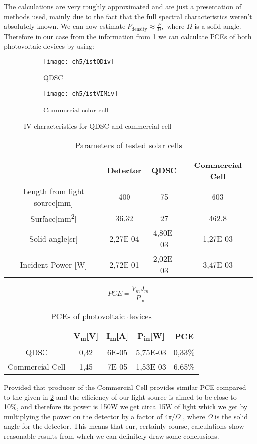 \noindent The calculations are very roughly approximated and are just a
presentation of methods used, mainly due to the fact that the full
spectral characteristics weren't absolutely known. We can now estimate
\(P_{\text{density}} \approx \frac{P}{\Omega},\) where \(\Omega\) is a
solid angle. Therefore in our case from the information from \ref{tab:1stparam} we can calculate PCEs of both
photovoltaic devices by using:
\begin{figure}[b]
	\centering
	\begin{subfigure}[b]{0.49\textwidth}
	\centering
	\texttt{[image: ch5/istQDiv]}
	\caption{QDSC}
	\end{subfigure}
	\hfill
	\begin{subfigure}[b]{0.49\textwidth}
	\centering
	\texttt{[image: ch5/istVIMiv]}
	\caption{Commercial solar cell}{}
	\end{subfigure}
	\caption{IV characteristics for QDSC and commercial cell }
\end{figure}

\begin{table}[h]
\centering
\begin{tabular}{|c |c | c | c |}
\hline
& Detector & QDSC & Commercial Cell\\
\hline
Length from light source{[}mm{]} & 400 & 75 & 603\\
\hline
Surface{[}mm\textsuperscript{2}{]} & 36,32 & 27 & 462,8\\
\hline
Solid angle{[}sr{]} & 2,27E-04 & 4,80E-03 & 1,27E-03\\
\hline
Incident Power {[}W{]} & 2,72E-01 & 2,02E-03 & 3,47E-03\\
\hline
\end{tabular}
\caption{Parameters of tested solar cells}
\label{tab:1stparam}
\end{table}

\begin{equation}
PCE = \frac{V_{m}J_{m}}{P_{\text{in}}}
\end{equation}

\begin{table}[h]
\centering
\begin{tabular}{|c |c |c | c | c|}
\hline
& V\textsubscript{m}{[}V{]} & I\textsubscript{m}{[}A{]} &P\textsubscript{in}{[}W{]} & PCE\\
\hline
QDSC & 0,32 & 6E-05 & 5,75E-03 & 0,33$\%$\\
\hline
Commercial Cell & 1,45 & 7E-05 & 1,53E-03 & 6,65$\%$\\
\hline
\end{tabular}
\caption{PCEs of photovoltaic devices}
\label{tab:1stPCE}
\end{table}
\noindent Provided that producer of the Commercial Cell provides similar PCE
compared to the given in \ref{tab:1stPCE} and the efficiency of our light
source is aimed to be close to 10\%, and therefore its power is 150W we
get circa 15W of light which we get by multiplying the power on the
detector by a factor of $4\pi /\Omega $ , where $\Omega$ is the solid angle for the
detector. This means that our, certainly course, calculations show
reasonable results from which we can definitely draw some conclusions.

